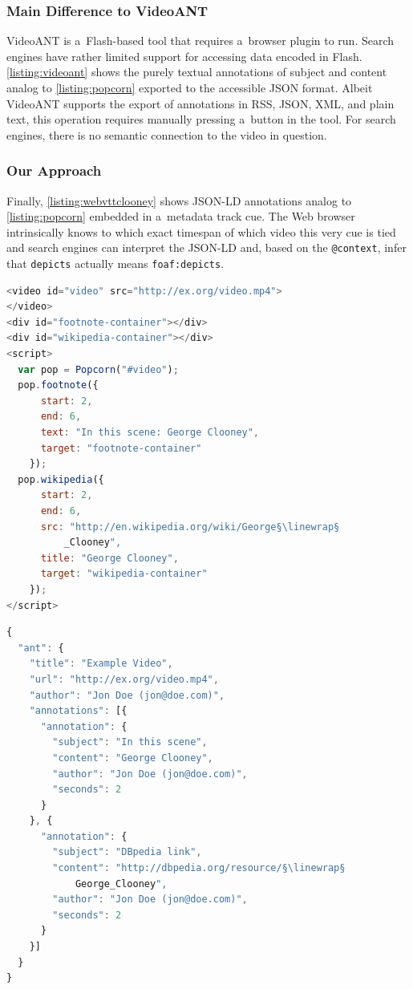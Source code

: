 \documentclass[runningheads,a4paper]{llncs}
\newcommand{\linewrap}{\raisebox{-.6ex}{\textcolor{grey}{$\hookleftarrow$}}}
\begin{document}
\subsubsection{Main Difference to VideoANT}

VideoANT is a~Flash-based tool that requires a~browser plugin to run.
Search engines have rather limited support
for accessing data encoded in Flash.
\autoref{listing:videoant} shows the purely textual annotations
of subject and content analog to \autoref{listing:popcorn}
exported to the accessible JSON format.
Albeit VideoANT supports the export of annotations
in RSS, JSON, XML, and plain text,
this operation requires manually pressing a~button in the tool.
For search engines, there is no semantic connection
to the video in question.

\subsubsection{Our Approach}

Finally, \autoref{listing:webvttclooney} shows JSON-LD annotations
analog to \autoref{listing:popcorn} embedded in a~metadata track cue.
The Web browser intrinsically knows to which exact timespan
of which video this very cue is tied and search engines can interpret
the JSON-LD and, based on the \texttt{@context},
infer that \texttt{depicts} actually means \texttt{foaf:depicts}.

\begin{lstlisting}[caption={Popcorn.js example},
  label=listing:popcorn, float=t!, language=JavaScript]
<video id="video" src="http://ex.org/video.mp4">
</video>
<div id="footnote-container"></div>
<div id="wikipedia-container"></div>
<script>
  var pop = Popcorn("#video");
  pop.footnote({
      start: 2,
      end: 6,
      text: "In this scene: George Clooney",
      target: "footnote-container"
    });
  pop.wikipedia({
      start: 2,
      end: 6,
      src: "http://en.wikipedia.org/wiki/George§\linewrap§
          _Clooney",
      title: "George Clooney",
      target: "wikipedia-container"
    });    
</script>
\end{lstlisting}

\begin{lstlisting}[caption={VideoANT annotations analog to \autoref{listing:popcorn}},
  label=listing:videoant, language=JavaScript, float=t!]
{
  "ant": {
    "title": "Example Video",
    "url": "http://ex.org/video.mp4",
    "author": "Jon Doe (jon@doe.com)",
    "annotations": [{
      "annotation": {
        "subject": "In this scene",
        "content": "George Clooney",
        "author": "Jon Doe (jon@doe.com)",
        "seconds": 2
      }
    }, {
      "annotation": {
        "subject": "DBpedia link",
        "content": "http://dbpedia.org/resource/§\linewrap§
            George_Clooney",
        "author": "Jon Doe (jon@doe.com)",
        "seconds": 2
      }
    }]
  }
}
\end{lstlisting}
\end{document}
